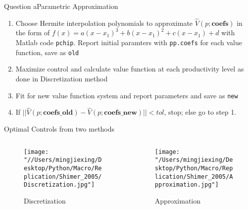 \documentclass{beamer}
\begin{document}
\begin{frame}{Question a}{Parametric Approximation}
    \begin{enumerate}\addtocounter{enumi}{-1}
        \item Choose Hermite interpolation polynomials to approximate $\hat{V}(p;\textbf{coefs})$ in the form of \(
            f(x) = a (x-x_1)^3 + b(x-x_1)^2 + c(x-x_1)+d 
            \) with Matlab code \texttt{pchip}. Report initial paramters with \texttt{pp.coefs} for each value function, save as \texttt{old}
        \item Maximize control and calculate value function at each productivity level as done in Discretization method
        \item Fit for new value function system and report parameters and save as \texttt{new}
        \item If \(||\hat{V}(p;\textbf{coefs\_old})-\hat{V}(p;\textbf{coefs\_new})||<tol\), stop; else go to step 1.
    \end{enumerate}
\end{frame}

    

\begin{frame}{Optimal Controls from two methods}
    \begin{columns}[c]
            \begin{column}{.6\textwidth}
            \begin{figure}
                \centering
                \texttt{[image: "//Users/mingjiexing/Desktop/Python/Macro/Replication/Shimer\_2005/Discretization.jpg"]}
                \caption{Discretization}
            \end{figure}      
            \end{column}
            \begin{column}{.6\textwidth}
            \begin{figure}
                \centering
                \texttt{[image: "/Users/mingjiexing/Desktop/Python/Macro/Replication/Shimer\_2005/Approximation.jpg"]}
                \caption{Approximation}
            \end{figure}
            \end{column}
        \end{columns}
\end{frame}
\end{document}

